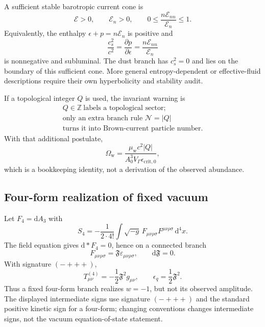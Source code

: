 \documentclass[
  aps,
  prd,
  reprint,
  superscriptaddress,
  floatfix,
  nofootinbib,
  longbibliography
]{revtex4-2}
\theoremstyle{plain}
\theoremstyle{definition}
\theoremstyle{remark}
\newcommand{\dd}{\mathrm d}
\newcommand{\crit}{\mathrm{crit}}
\newcommand{\wind}{\mathrm w}
\newcommand{\Fcal}{\mathfrak F}
\newcommand{\Ecal}{\mathcal E}
\newcommand{\Z}{\mathbb Z}
\begin{document}
A sufficient stable barotropic current cone is
\begin{equation}
\boxed{
\Ecal>0,
\qquad
\Ecal_n>0,
\qquad
0\le \frac{n\Ecal_{nn}}{\Ecal_n}\le1.
}
\label{eq:stability_cone}
\end{equation}
Equivalently, the enthalpy \(\epsilon+p=n\Ecal_n\) is positive and
\begin{equation}
\frac{c_s^2}{c^2}=\frac{\partial p}{\partial\epsilon}=\frac{n\Ecal_{nn}}{\Ecal_n}
\end{equation}
is nonnegative and subluminal.  The dust branch has \(c_s^2=0\) and lies on the boundary of this sufficient cone.  More general entropy-dependent or effective-fluid descriptions require their own hyperbolicity and stability audit.

If a topological integer \(Q\) is used, the invariant warning is
\begin{equation}
\boxed{\begin{gathered}
Q\in\Z\ \text{labels a topological sector;}\\
\text{only an extra branch rule }\mathcal N=|Q|\\
\text{turns it into Brown-current particle number.}
\end{gathered}}
\label{eq:Qwarning}
\end{equation}
With that additional postulate,
\begin{equation}
\Omega_{\wind}
=\frac{\mu_{\wind}c^2|Q|}{A_0^3V_\Gamma\epsilon_{\crit,0}},
\end{equation}
which is a bookkeeping identity, not a derivation of the observed abundance.

\subsection{Four-form realization of fixed vacuum}

Let \(F_4=\dd A_3\) with
\begin{equation}
S_4=-\frac{1}{2\cdot4!}\int\sqrt{-g}\,F_{\mu\nu\rho\sigma}F^{\mu\nu\rho\sigma}\,\dd^4x.
\label{eq:S4}
\end{equation}
The field equation gives \(\dd*F_4=0\), hence on a connected branch
\begin{equation}
F_{\mu\nu\rho\sigma}=\Fcal\varepsilon_{\mu\nu\rho\sigma},
\qquad
\dd\Fcal=0.
\label{eq:Fbranch}
\end{equation}
With signature \((-+++ )\),
\begin{equation}
T^{(4)}_{\mu\nu}=-\frac12\Fcal^2 g_{\mu\nu},
\qquad
\epsilon_q=\frac12\Fcal^2.
\label{eq:four_stress}
\end{equation}
Thus a fixed four-form branch realizes \(w=-1\), but not its observed amplitude.  The displayed intermediate signs use signature \((-+++ )\) and the standard positive kinetic sign for a four-form; changing conventions changes intermediate signs, not the vacuum equation-of-state statement.
\end{document}
